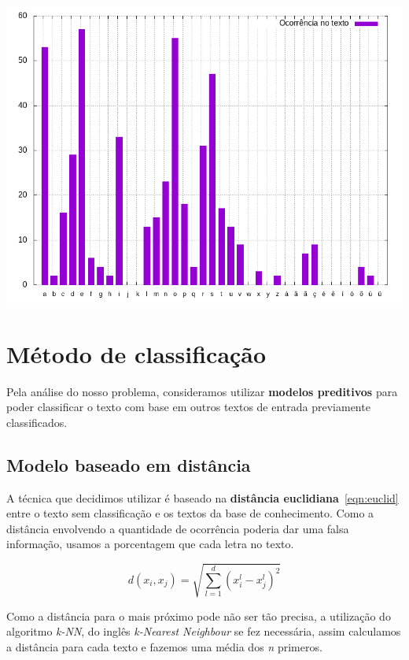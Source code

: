 \documentclass[a0,portrait]{a0poster}
\begin{document}
\begin{multicols}{2}
\begin{center}\vspace{1cm}
    \includegraphics[width=0.8\linewidth]{freq-ptbr.png}
\end{center}\vspace{1cm}

\section*{Método de classificação}
Pela análise do nosso problema, consideramos utilizar \textbf{modelos preditivos} para poder classificar o texto com base em outros textos de entrada previamente classificados.

\subsection*{Modelo baseado em distância}
A técnica que decidimos utilizar é baseado na \textbf{distância euclidiana}~\ref{eqn:euclid} entre o texto sem classificação e os textos da base de conhecimento. Como a distância envolvendo a quantidade de ocorrência poderia dar uma falsa informação, usamos a porcentagem que cada letra no texto.

\begin{equation}
d(x_i, x_j) = \sqrt{\sum_{l=1}^{d} (x^l_i - x^l_j)^2}
\label{eqn:euclid}
\end{equation}

Como a distância para o mais próximo pode não ser tão precisa, a utilização do algoritmo \emph{k-NN}, do inglês \emph{k-Nearest Neighbour} se fez necessária, assim calculamos a distância para cada texto e fazemos uma média dos \emph{n} primeros.


\end{multicols}
\end{document}

